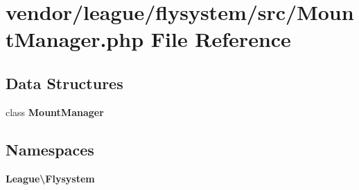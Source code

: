 \section{vendor/league/flysystem/src/\+Mount\+Manager.php File Reference}
\label{_mount_manager_8php}
\subsection*{Data Structures}
\begin{DoxyCompactItemize}
\item 
class {\bf Mount\+Manager}
\end{DoxyCompactItemize}
\subsection*{Namespaces}
\begin{DoxyCompactItemize}
\item 
 {\bf League\textbackslash{}\+Flysystem}
\end{DoxyCompactItemize}
